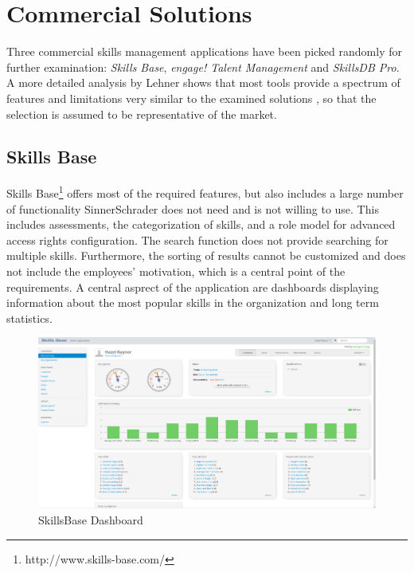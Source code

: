 \section{Commercial Solutions}
\label{commercial}
Three commercial skills management applications have been picked randomly for further examination: \textit{Skills Base}, \textit{engage! Talent Management} and \textit{SkillsDB Pro}.
A more detailed analysis by Lehner shows that most tools provide a spectrum of features and limitations very similar to the examined solutions \cite{Marktanalyse}, so that the selection is assumed to be representative of the market.

\subsection{Skills Base}
Skills Base\footnote{http://www.skills-base.com/} offers most of the required features, but also includes a large number of functionality SinnerSchrader does not need and is not willing to use. This includes assessments, the categorization of skills, and a role model for advanced access rights configuration.
The search function does not provide searching for multiple skills. Furthermore, the sorting of results cannot be customized and does not include the employees' motivation, which is a central point of the requirements. A central asprect of the application are dashboards displaying information about the most popular skills in the organization and long term statistics.
\begin{figure}[!htp]
    \centering
    \includegraphics[width=\textwidth]{images/skillsbase-dashboard.png}
    \caption[Screenshot: SkillsBase Dashboard]{SkillsBase Dashboard}
    \label{fig:skillsbase_dashboard}
\end{figure}

